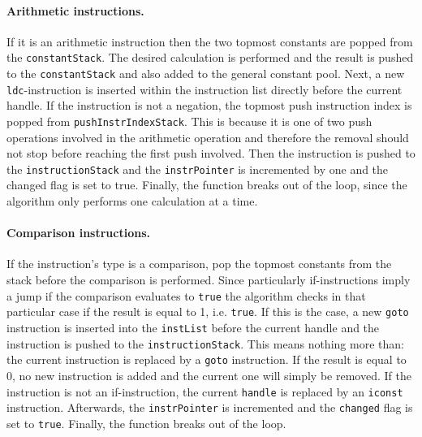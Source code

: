 \paragraph{Arithmetic instructions.}
If it is an arithmetic instruction then the two topmost constants are popped from the \texttt{constantStack}. The desired calculation is performed and the result is pushed to the \texttt{constantStack} and also added to the general constant pool. Next, a new \texttt{ldc}-instruction is inserted within the instruction list directly before the current handle. If the instruction is not a negation, the topmost push instruction index is popped from \texttt{pushInstrIndexStack}. This is because it is one of two push operations involved in the arithmetic operation and therefore the removal should not stop before reaching the first push involved. Then the instruction is pushed to the \texttt{instructionStack} and the \texttt{instrPointer} is incremented by one and the changed flag is set to true. Finally, the function breaks out of the loop, since the algorithm only performs one calculation at a time.

%

\paragraph{Comparison instructions.}
If the instruction’s type is a comparison, pop the topmost constants from the stack before the comparison is performed. Since particularly if-instructions imply a jump if the comparison evaluates to \texttt{true} the algorithm checks in that particular case if the result is equal to 1, i.e. \texttt{true}. If this is the case, a new \texttt{goto} instruction is inserted into the \texttt{instList} before the current handle and the instruction is pushed to the \texttt{instructionStack}. This means nothing more than: the current instruction is replaced by a \texttt{goto} instruction. If the result is equal to 0, no new instruction is added and the current one will simply be removed. If the instruction is not an if-instruction, the current \texttt{handle} is replaced by an \texttt{iconst} instruction. Afterwards, the \texttt{instrPointer} is incremented and the \texttt{changed} flag is set to \texttt{true}. Finally, the function breaks out of the loop.

